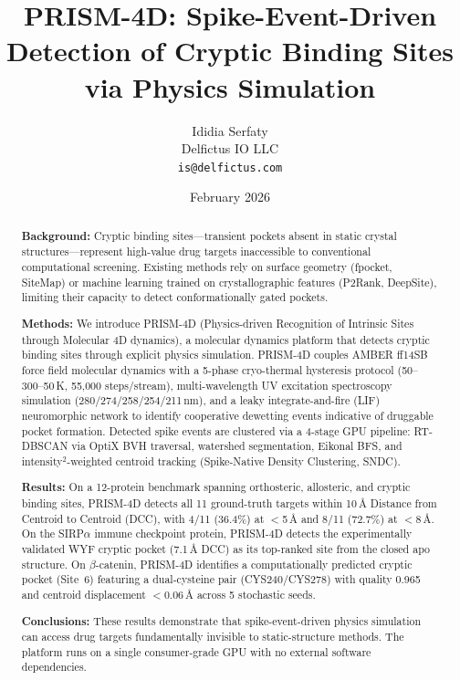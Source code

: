 \documentclass[11pt,twocolumn]{article}
\title{PRISM-4D: Spike-Event-Driven Detection of Cryptic Binding Sites via Physics Simulation}
\author{Ididia Serfaty \\
  Delfictus IO LLC \\
  \texttt{is@delfictus.com}}
\date{February 2026}
\begin{document}
\maketitle

\begin{abstract}

\textbf{Background:}
Cryptic binding sites---transient pockets absent in static crystal structures---represent
high-value drug targets inaccessible to conventional computational screening. Existing
methods rely on surface geometry (fpocket, SiteMap) or machine learning trained on
crystallographic features (P2Rank, DeepSite), limiting their capacity to detect
conformationally gated pockets.

\textbf{Methods:}
We introduce PRISM-4D (Physics-driven Recognition of Intrinsic Sites through Molecular 4D
dynamics), a molecular dynamics platform that detects cryptic binding sites through explicit
physics simulation. PRISM-4D couples AMBER ff14SB force field molecular dynamics with a
5-phase cryo-thermal hysteresis protocol (50--300--50\,K, 55{,}000 steps/stream),
multi-wavelength UV excitation spectroscopy simulation (280/274/258/254/211\,nm), and a
leaky integrate-and-fire (LIF) neuromorphic network to identify cooperative dewetting events
indicative of druggable pocket formation. Detected spike events are clustered via a 4-stage
GPU pipeline: RT-DBSCAN via OptiX BVH traversal, watershed segmentation, Eikonal BFS, and
intensity$^2$-weighted centroid tracking (Spike-Native Density Clustering, SNDC).

\textbf{Results:}
On a 12-protein benchmark spanning orthosteric, allosteric, and cryptic binding sites,
PRISM-4D detects all 11 ground-truth targets within 10\,\AA{} Distance from Centroid to
Centroid (DCC), with 4/11 (36.4\%) at $<$5\,\AA{} and 8/11 (72.7\%) at $<$8\,\AA{}.
On the SIRP$\alpha$ immune checkpoint protein, PRISM-4D detects the experimentally
validated WYF cryptic pocket (7.1\,\AA{} DCC) as its top-ranked site from the closed apo
structure. On $\beta$-catenin, PRISM-4D identifies a computationally predicted cryptic
pocket (Site~6) featuring a dual-cysteine pair (CYS240/CYS278) with quality 0.965 and
centroid displacement $<$0.06\,\AA{} across 5 stochastic seeds.

\textbf{Conclusions:}
These results demonstrate that spike-event-driven physics simulation can access drug targets
fundamentally invisible to static-structure methods. The platform runs on a single
consumer-grade GPU with no external software dependencies.
\end{abstract}
\end{document}
